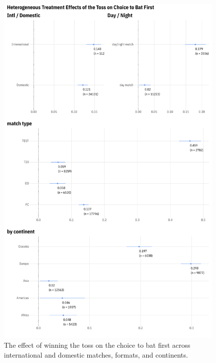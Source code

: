 \documentclass[12pt, letterpaper]{article}
\begin{document}
\begin{figure}
 \centering
 \includegraphics[scale=.5]{output/first_stage_by_matchtype.pdf}
 \caption{The effect of winning the toss on the choice to bat first across international and domestic matches, formats, and continents.}
 \label{fig:fs_het_TE1}
\end{figure}

\clearpage
\end{document}
